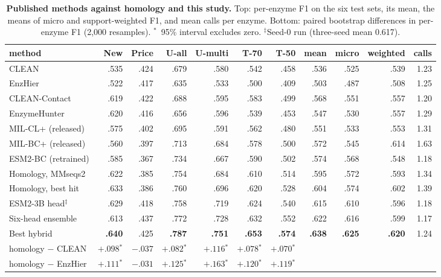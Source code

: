 \documentclass[11pt]{article}
\newcommand{\sig}{$^{*}$}
\begin{document}
\begin{table}[t]
\centering\small
\caption{\textbf{Published methods against homology and this study.} Top: per-enzyme F1 on the six test sets, its
mean, the means of micro and support-weighted F1, and mean calls per enzyme. Bottom: paired bootstrap differences in
per-enzyme F1 (2,000 resamples). \sig\ 95\% interval excludes zero. $^{\ddagger}$Seed-0 run (three-seed mean 0.617).}
\label{tab:published}
\footnotesize\setlength{\tabcolsep}{2.9pt}
\begin{tabular}{@{}lrrrrrrrrrr@{}}
\toprule
method & New & Price & U-all & U-multi & T-70 & T-50 & mean & micro & weighted & calls \\
\midrule
CLEAN & .535 & .424 & .679 & .580 & .542 & .458 & .536 & .525 & .539 & 1.23 \\
EnzHier & .522 & .417 & .635 & .533 & .500 & .409 & .503 & .487 & .508 & 1.25 \\
CLEAN-Contact & .619 & .422 & .688 & .595 & .583 & .499 & .568 & .551 & .557 & 1.20 \\
EnzymeHunter & .620 & .416 & .656 & .596 & .539 & .453 & .547 & .530 & .557 & 1.29 \\
MIL-CL+ (released) & .575 & .402 & .695 & .591 & .562 & .480 & .551 & .533 & .553 & 1.31 \\
MIL-BC+ (released) & .560 & .397 & .713 & .684 & .578 & .500 & .572 & .545 & .614 & 1.63 \\
ESM2-BC (retrained) & .585 & .367 & .734 & .667 & .590 & .502 & .574 & .568 & .548 & 1.18 \\
\addlinespace
Homology, MMseqs2 & .622 & .385 & .754 & .684 & .610 & .514 & .595 & .572 & .593 & 1.34 \\
Homology, best hit & .633 & .386 & .760 & .696 & .620 & .528 & .604 & .574 & .602 & 1.39 \\
ESM2-3B head$^{\ddagger}$ & .629 & .418 & .758 & .719 & .624 & .540 & .615 & .610 & .596 & 1.18 \\
Six-head ensemble & .613 & .437 & .772 & .728 & .632 & .552 & .622 & .616 & .599 & 1.17 \\
Best hybrid & \textbf{.640} & .425 & \textbf{.787} & \textbf{.751} & \textbf{.653} & \textbf{.574} & \textbf{.638} & \textbf{.625} & \textbf{.620} & 1.24 \\
\midrule
homology $-$ CLEAN & $+.098$\sig & $-.037$ & $+.082$\sig & $+.116$\sig & $+.078$\sig & $+.070$\sig & & & & \\
homology $-$ EnzHier & $+.111$\sig & $-.031$ & $+.125$\sig & $+.163$\sig & $+.120$\sig & $+.119$\sig & & & & \\

\end{tabular}
\end{table}
\end{document}
